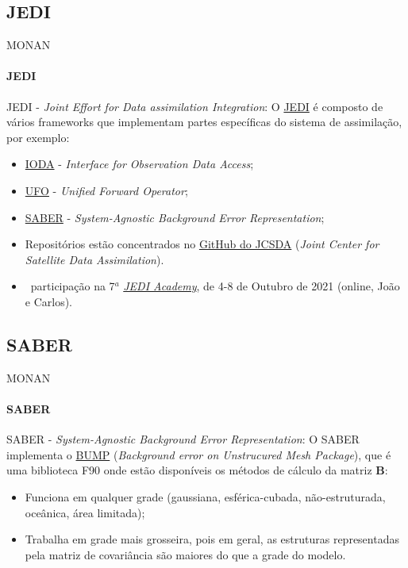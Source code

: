 \documentclass[10pt,aspectratio=169]{beamer}
\begin{document}
\subsection{JEDI}

\begin{frame}[fragile]{MONAN}
\framesubtitle{JEDI \faJedi}
	\begin{block}{JEDI - \textit{Joint Effort for Data assimilation Integration}:}
	\vspace{0.5em}
    O \href{https://www.jcsda.org/jcsda-project-jedi}{JEDI} é composto de vários frameworks que implementam partes específicas do sistema de assimilação, por exemplo:
    \begin{itemize}
        \item \href{https://github.com/JCSDA/ioda}{IODA} - \textit{Interface for Observation Data Access};
        \item \href{https://github.com/JCSDA/ufo}{UFO} - \textit{Unified Forward Operator};
        \item \href{https://github.com/JCSDA/saber}{SABER} - \textit{System-Agnostic Background Error Representation};
        \pause
        \item Repositórios estão concentrados no \href{https://github.com/orgs/JCSDA/repositories}{GitHub do JCSDA} (\textit{Joint Center for Satellite Data Assimilation}).
    \end{itemize}
    \vspace{1em}
    \pause
    \begin{itemize}
    	\item \faUserGraduate~participação na 7$^{a}$ \textit{\href{https://www.jcsda.org/jedi-academies}{JEDI Academy}}, de 4-8 de Outubro de 2021 (online, João e Carlos).
    \end{itemize}
	\end{block}
\end{frame}

\subsection{SABER}

\begin{frame}[fragile]{MONAN}
\framesubtitle{SABER \faRebel}
	\begin{block}{SABER - \textit{System-Agnostic Background Error Representation}:}
	\vspace{0.5em}
    O SABER implementa o \href{https://github.com/benjaminmenetrier/bump-standalone}{BUMP} (\textit{Background error on Unstrucured Mesh Package}), que é uma biblioteca F90 onde estão disponíveis os métodos de cálculo da matriz $\mathbf{B}$:
    \begin{itemize}
        \item Funciona em qualquer grade (gaussiana, esférica-cubada, não-estruturada, oceânica, área limitada);
        \item Trabalha em grade mais grosseira, pois em geral, as estruturas representadas pela matriz de covariância são maiores do que a grade do modelo.
    \end{itemize}		
	\end{block}
\end{frame}
\end{document}
